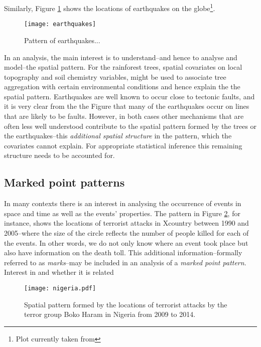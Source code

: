 Similarly, Figure \ref{fig:earthquakes} shows the locations of earthquakes on the globe\footnote{Plot currently taken from %
}. 
\begin{figure}
\centering
\texttt{[image: earthquakes]}
\caption{\label{fig:earthquakes} Pattern of earthquakes...}
\end{figure}
In an analysis, the main interest is to understand--and hence to analyse and model--the spatial pattern. For the rainforest  trees, spatial covariates on local topography and soil chemistry variables, might be used to associate tree aggregation with certain environmental conditions and hence explain the the spatial pattern. Earthquakes are well known to occur close to tectonic faults, and it is very clear from the the Figure that many of the earthquakes occur on lines that are likely to be faults. However, in both cases other mechanisms that are often less well understood contribute to the spatial pattern formed by the trees or the earthquakes--this \textit{additional spatial structure} in the pattern, which the covariates cannot explain. For appropriate statistical inference this remaining structure needs to be accounted for.

\subsection{Marked point patterns}
In many contexts there is an interest in analysing the occurrence of events in space and time as well as the events' properties. The pattern in Figure \ref{fig:bokoharam}, for instance, shows the locations of terrorist attacks in Xcountry between 1990 and 2005--where the size of the circle reflects the number of people killed for each of the events. In other words, we do not only know where an event took place but also have information on the death toll. This additional information--formally referred to as \textit{marks}--may be included in an analysis of a \textit{marked point pattern}. Interest in and whether it is related 

\begin{figure}
\begin{center}
\centerline{\texttt{[image: nigeria.pdf]}}
\end{center}
\caption{Spatial pattern formed by the locations of terrorist attacks by the terror group Boko Haram in Nigeria from 2009 to 2014.}
\label{fig:bokoharam}
\end{figure}

